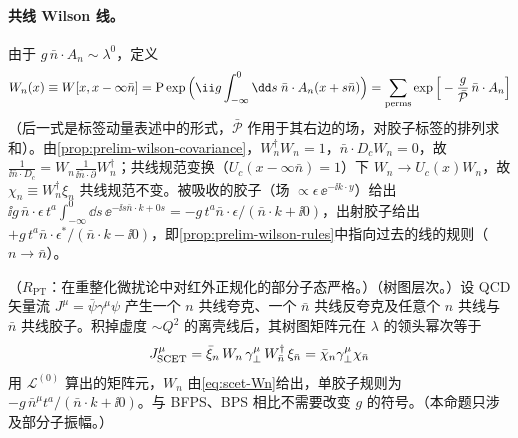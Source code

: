 \paragraph{共线 Wilson 线。}
由于 $g\,\bar n\cdot A_n\sim\lambda^0$，定义
\begin{equation}\label{eq:scet-Wn}
W_n(x)\equiv W[x,x-\infty\bar n]=\mathrm P\exp\Big(\ii g\int_{-\infty}^0\dd s\;\bar n\cdot A_n(x+s\bar n)\Big)
=\sum_{\rm perms}\exp\Big[-\frac{g}{\bar{\mathcal P}}\,\bar n\cdot A_n\Big]
\end{equation}
（后一式是标签动量表述中的形式\cite{BauerEtAl2001,BauerPirjolStewart2001}，$\bar{\mathcal P}$ 作用于其右边的场，对胶子标签的排列求和）。由\cref{prop:prelim-wilson-covariance}，$W_n^\dagger W_n=1$，$\bar n\cdot D_cW_n=0$，故 $\frac{1}{\ii\bar n\cdot D_c}=W_n\frac{1}{\ii\bar n\cdot\partial}W_n^\dagger$；共线规范变换（$U_c(x-\infty\bar n)=1$）下 $W_n\to U_c(x)W_n$，故 $\chi_n\equiv W_n^\dagger\xi_n$ 共线规范不变。被吸收的胶子（场 $\propto\epsilon\,\ee^{-\ii k\cdot y}$）给出 $\ii g\,\bar n\cdot\epsilon\,t^a\int_{-\infty}^0\dd s\,\ee^{-\ii s\bar n\cdot k+0s}=-g\,t^a\bar n\cdot\epsilon/(\bar n\cdot k+\ii0)$，出射胶子给出 $+g\,t^a\bar n\cdot\epsilon^*/(\bar n\cdot k-\ii0)$，即\cref{prop:prelim-wilson-rules}中指向过去的线的规则（$n\to\bar n$）。

\begin{proposition}\label{prop:scet-wilson}
（$R_{\mathrm{PT}}$：在重整化微扰论中对红外正规化的部分子态严格。）（树图层次。）设 QCD 矢量流 $J^\mu=\bar\psi\gamma^\mu\psi$ 产生一个 $n$ 共线夸克、一个 $\bar n$ 共线反夸克及任意个 $n$ 共线与 $\bar n$ 共线胶子。积掉虚度 $\sim Q^2$ 的离壳线后，其树图矩阵元在 $\lambda$ 的领头幂次等于
\begin{equation}\label{eq:scet-Jtree}
J^\mu_{\rm SCET}=\bar\xi_n\,W_n\,\gamma_\perp^\mu\,W_{\bar n}^\dagger\,\xi_{\bar n}=\bar\chi_n\gamma_\perp^\mu\chi_{\bar n}
\end{equation}
用 $\mathcal L^{(0)}$ 算出的矩阵元，$W_n$ 由\cref{eq:scet-Wn}给出，单胶子规则为 $-g\,\bar n^\mu t^a/(\bar n\cdot k+\ii0)$。与 BFPS、BPS 相比不需要改变 $g$ 的符号。（本命题只涉及部分子振幅。）
\end{proposition}

